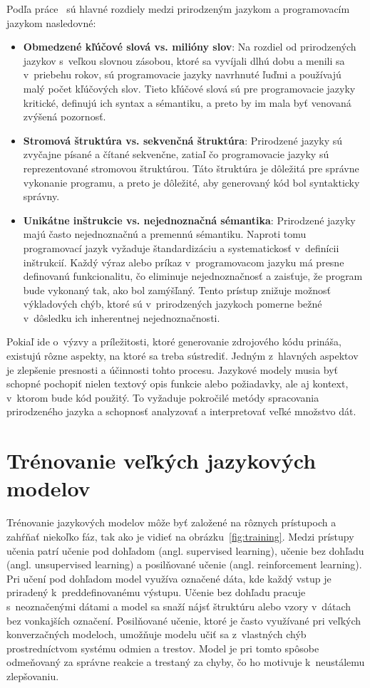 \noindent Podľa práce~\cite{ren2020codebleu} sú hlavné rozdiely medzi prirodzeným jazykom a programovacím jazykom nasledovné:
\begin{itemize}
    \item \textbf{Obmedzené kľúčové slová vs. milióny slov}: Na rozdiel od prirodzených jazykov s~veľkou slovnou zásobou, ktoré sa vyvíjali dlhú dobu a menili sa v~priebehu rokov, sú programovacie jazyky navrhnuté ľuďmi a používajú malý počet kľúčových slov. Tieto kľúčové slová sú pre programovacie jazyky kritické, definujú ich syntax a sémantiku, a preto by im mala byť venovaná zvýšená pozornosť.

    \item \textbf{Stromová štruktúra vs. sekvenčná štruktúra}: Prirodzené jazyky sú zvyčajne písané a čítané sekvenčne, zatiaľ čo programovacie jazyky sú reprezentované stromovou štruktúrou. Táto štruktúra je dôležitá pre správne vykonanie programu, a preto je dôležité, aby generovaný kód bol syntakticky správny.

    \item \textbf{Unikátne inštrukcie vs. nejednoznačná sémantika}: Prirodzené jazyky majú často nejednoznačnú a premennú sémantiku. Naproti tomu programovací jazyk vyžaduje štandardizáciu a systematickosť v~definícii inštrukcií. Každý výraz alebo príkaz v~programovacom jazyku má presne definovanú funkcionalitu, čo eliminuje nejednoznačnosť a zaisťuje, že program bude vykonaný tak, ako bol zamýšľaný. Tento prístup znižuje možnosť výkladových chýb, ktoré sú v~prirodzených jazykoch pomerne bežné v~dôsledku ich inherentnej nejednoznačnosti.
\end{itemize}

Pokiaľ ide o~výzvy a príležitosti, ktoré generovanie zdrojového kódu prináša, existujú rôzne aspekty, na ktoré sa treba sústrediť. Jedným z~hlavných aspektov je zlepšenie presnosti a účinnosti tohto procesu. Jazykové modely musia byť schopné pochopiť nielen textový opis funkcie alebo požiadavky, ale aj kontext, v~ktorom bude kód použitý. To vyžaduje pokročilé metódy spracovania prirodzeného jazyka a schopnosť analyzovať a interpretovať veľké množstvo dát.

\chapter{Trénovanie veľkých jazykových modelov}\label{chap:training}

Trénovanie jazykových modelov môže byť založené na rôznych prístupoch a zahŕňať niekoľko fáz, tak ako je vidieť na obrázku~\ref{fig:training}. Medzi prístupy učenia patrí učenie pod dohľadom (angl. supervised learning), učenie bez dohľadu (angl. unsupervised learning) a posilňované učenie (angl. reinforcement learning). Pri učení pod dohľadom model využíva označené dáta, kde každý vstup je priradený k~preddefinovanému výstupu. Učenie bez dohľadu pracuje s~neoznačenými dátami a model sa snaží nájsť štruktúru alebo vzory v~dátach bez vonkajších označení. Posilňované učenie, ktoré je často využívané pri veľkých konverzačných modeloch, umožňuje modelu učiť sa z~vlastných chýb prostredníctvom systému odmien a trestov. Model je pri tomto spôsobe odmeňovaný za správne reakcie a trestaný za chyby, čo ho motivuje k~neustálemu zlepšovaniu.

